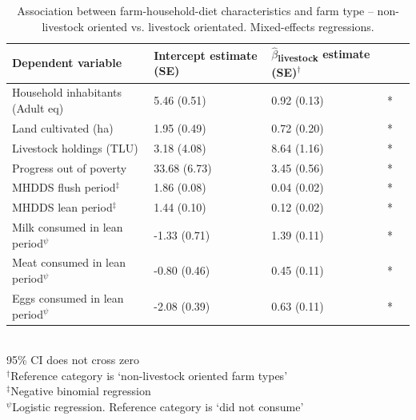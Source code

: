 \begin{table}[H]
  \captionsetup{singlelinecheck = false, justification=justified}
  \caption{
  Association between farm-household-diet characteristics and farm type -- non-livestock oriented vs. livestock orientated. Mixed-effects regressions.
  }
  \label{tab:C_12}
  \small
\begin{tabular}{L{5cm} C{2.5cm} C{2.5cm} C{2cm} C{2cm}}
\toprule
Dependent variable & Intercept estimate (SE) & $\hat{\beta}$\textsubscript{livestock} estimate (SE)$^{\dag}$ &  \\
\midrule
Household inhabitants (Adult eq) & 5.46 (0.51) & 0.92 (0.13) & * \\
Land cultivated (ha) & 1.95 (0.49) & 0.72 (0.20) & * \\
Livestock holdings (TLU) & 3.18 (4.08) & 8.64 (1.16) & * \\
Progress out of poverty & 33.68 (6.73) & 3.45 (0.56) & * \\
MHDDS flush period$^{\ddag}$ & 1.86 (0.08) & 0.04 (0.02) & * \\
MHDDS lean period$^{\ddag}$ & 1.44 (0.10) & 0.12 (0.02) & * \\
Milk consumed in lean period$^\psi$ & -1.33 (0.71) & 1.39 (0.11) & * \\
Meat consumed in lean period$^\psi$ & -0.80 (0.46) & 0.45 (0.11) & * \\
Eggs consumed in lean period$^\psi$ & -2.08 (0.39) & 0.63 (0.11) & * \\
\bottomrule
\end{tabular}
\footnotesize
\raggedright
\\
95\% CI does not cross zero \\
$^{\dag}$Reference category is `non-livestock oriented farm types' \\
$^{\ddag}$Negative binomial regression \\
$^\psi$Logistic regression. Reference category is `did not consume'
\end{table}


